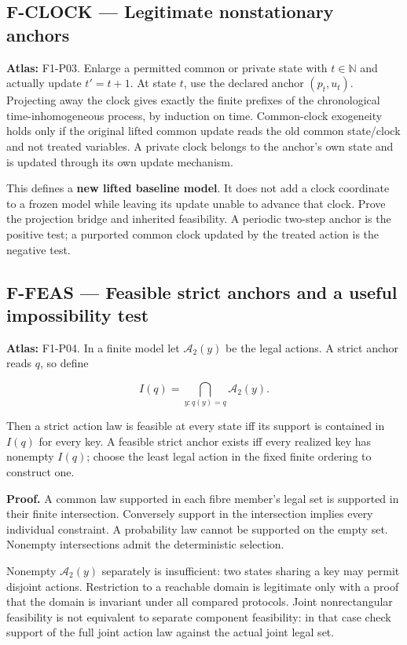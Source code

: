 \documentclass[
  11pt,
  a4paper,
]{article}
\begin{document}
\subsection{F-CLOCK --- Legitimate nonstationary
anchors}\label{f-clock-legitimate-nonstationary-anchors}

\textbf{Atlas:} F1-P03. Enlarge a permitted common or private state with
\(t\in\mathbb N\) and actually update \(t'=t+1\). At state \(t\), use
the declared anchor \((p_t,u_t)\). Projecting away the clock gives
exactly the finite prefixes of the chronological time-inhomogeneous
process, by induction on time. Common-clock exogeneity holds only if the
original lifted common update reads the old common state/clock and not
treated variables. A private clock belongs to the anchor's own state and
is updated through its own update mechanism.

This defines a \textbf{new lifted baseline model}. It does not add a
clock coordinate to a frozen model while leaving its update unable to
advance that clock. Prove the projection bridge and inherited
feasibility. A periodic two-step anchor is the positive test; a
purported common clock updated by the treated action is the negative
test.

\subsection{F-FEAS --- Feasible strict anchors and a useful
impossibility
test}\label{f-feas-feasible-strict-anchors-and-a-useful-impossibility-test}

\textbf{Atlas:} F1-P04. In a finite model let \(\mathcal A_2(y)\) be the
legal actions. A strict anchor reads \(q\), so define

\[I(q)=\bigcap_{y:q(y)=q}\mathcal A_2(y).\]

Then a strict action law is feasible at every state iff its support is
contained in \(I(q)\) for every key. A feasible strict anchor exists iff
every realized key has nonempty \(I(q)\); choose the least legal action
in the fixed finite ordering to construct one.

\textbf{Proof.} A common law supported in each fibre member's legal set
is supported in their finite intersection. Conversely support in the
intersection implies every individual constraint. A probability law
cannot be supported on the empty set. Nonempty intersections admit the
deterministic selection.

Nonempty \(\mathcal A_2(y)\) separately is insufficient: two states
sharing a key may permit disjoint actions. Restriction to a reachable
domain is legitimate only with a proof that the domain is invariant
under all compared protocols. Joint nonrectangular feasibility is not
equivalent to separate component feasibility: in that case check support
of the full joint action law against the actual joint legal set.
\end{document}
